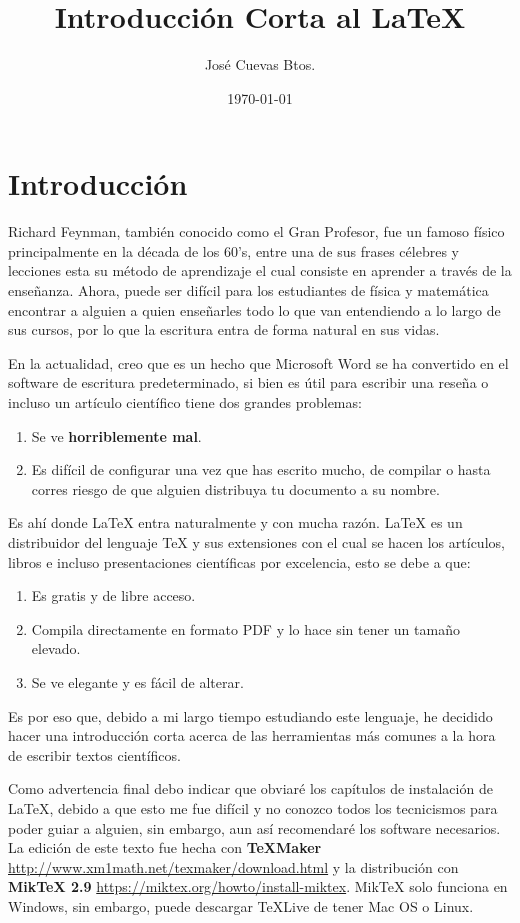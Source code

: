 \documentclass[11pt,oneside,letterpaper]{book}
\title{Introducción Corta al \LaTeX}
\author{José Cuevas Btos.}
\date\today
\theoremstyle{custom}
\theoremstyle{definition}
\begin{document}
\maketitle
\tableofcontents

\chapter*{Introducción}
Richard Feynman, también conocido como el Gran Profesor, fue un famoso físico principalmente en la década de los 60's, entre una de sus frases célebres y lecciones esta su método de aprendizaje el cual consiste en aprender a través de la enseñanza. Ahora, puede ser difícil para los estudiantes de física y matemática encontrar a alguien a quien enseñarles todo lo que van entendiendo a lo largo de sus cursos, por lo que la escritura entra de forma natural en sus vidas.

En la actualidad, creo que es un hecho que Microsoft Word se ha convertido en el software de escritura predeterminado, si bien es útil para escribir una reseña o incluso un artículo científico tiene dos grandes problemas:
\begin{enumerate}
\item Se ve \textbf{horriblemente mal}.
\item Es difícil de configurar una vez que has escrito mucho, de compilar o hasta corres riesgo de que alguien distribuya tu documento a su nombre.
\end{enumerate}
Es ahí donde \LaTeX{} entra naturalmente y con mucha razón. \LaTeX{} es un distribuidor del lenguaje \TeX{} y sus extensiones con el cual se hacen los artículos, libros e incluso presentaciones científicas por excelencia, esto se debe a que:
\begin{enumerate}
\item Es gratis y de libre acceso.
\item Compila directamente en formato PDF y lo hace sin tener un tamaño elevado.
\item Se ve elegante y es fácil de alterar.
\end{enumerate}
Es por eso que, debido a mi largo tiempo estudiando este lenguaje, he decidido hacer una introducción corta acerca de las herramientas más comunes a la hora de escribir textos científicos.

Como advertencia final debo indicar que obviaré los capítulos de instalación de \LaTeX{}, debido a que esto me fue difícil y no conozco todos los tecnicismos para poder guiar a alguien, sin embargo, aun así recomendaré los software necesarios. La edición de este texto fue hecha con \textbf{\TeX{}Maker} \url{http://www.xm1math.net/texmaker/download.html} y la distribución con \textbf{Mik\TeX{} 2.9} \url{https://miktex.org/howto/install-miktex}. Mik\TeX{} solo funciona en Windows, sin embargo, puede descargar \TeX{}Live de tener Mac OS o Linux.
\end{document}
